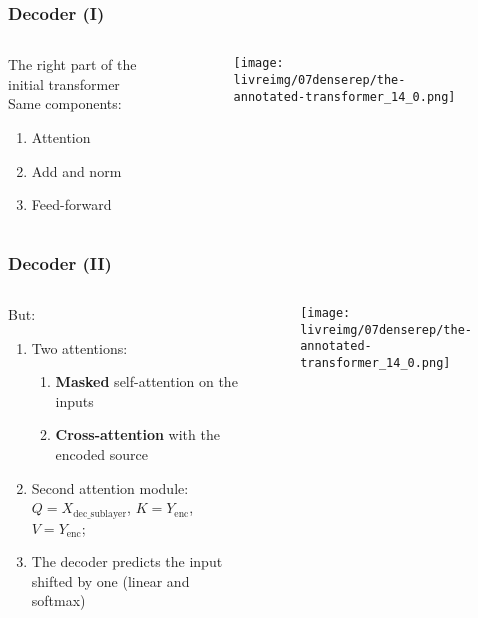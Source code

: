\begin{frame}[fragile]
\frametitle{Decoder (I)}\color{structure}
\begin{columns}
\begin{column}[c]{0.62\textwidth}
The right part of the initial transformer\\
Same components:
\begin{enumerate}\color{structure}
\item Attention
\item Add and norm
\item Feed-forward
\end{enumerate}
\end{column}
\begin{column}[c]{0.4\textwidth}
\begin{figure}[tb]
\begin{center}
 \texttt{[image: \\livreimg/07denserep/the-annotated-transformer\_14\_0.png]}
\end{center}
\end{figure}
\end{column}
\end{columns}
\end{frame}

\begin{frame}[fragile]
\frametitle{Decoder (II)}\color{structure}
\begin{columns}
\begin{column}[c]{0.62\textwidth}

But: 
\begin{enumerate}\color{structure}
\item Two attentions: 
\begin{enumerate}\color{structure}
\item \textbf{Masked} self-attention on the inputs
\item \textbf{Cross-attention} with the encoded source
\end{enumerate}
\item Second attention module: $Q = {X}_\text{dec\_sublayer}$, $K = Y_\text{enc}$, $V = Y_\text{enc}$;
\item The decoder predicts the input shifted by one (linear and softmax)
\end{enumerate}
\end{column}
\begin{column}[c]{0.4\textwidth}
\begin{figure}[tb]
\begin{center}
 \texttt{[image: \\livreimg/07denserep/the-annotated-transformer\_14\_0.png]}
\end{center}
\end{figure}
\end{column}
\end{columns}
\end{frame}

